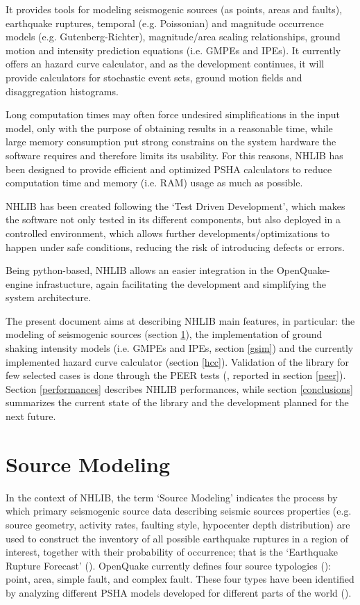 \documentclass[11pt,a4paper,headings=small,dvips]{scrartcl}
\begin{document}
It provides tools for modeling seismogenic sources (as points, areas and 
faults), earthquake ruptures, temporal (e.g. Poissonian) and magnitude 
occurrence models (e.g. Gutenberg-Richter), magnitude/area scaling 
relationships, ground motion and intensity prediction equations (i.e. 
GMPEs and IPEs). It currently offers an hazard curve calculator, and 
as the development continues, it will provide calculators for stochastic 
event sets, ground motion fields and disaggregation histograms.

Long computation times may often force undesired simplifications in the 
input model, only with the purpose of obtaining results in a reasonable 
time, while large memory consumption put strong constrains on the system 
hardware the software requires and therefore limits its usability.
For this reasons, NHLIB has been designed to provide efficient and 
optimized PSHA calculators to reduce computation time and memory (i.e. 
RAM) usage as much as possible. 

NHLIB has been created following the `Test Driven Development', which 
makes the software not only tested in its different components, but 
also deployed in a controlled environment, which allows further 
developments/optimizations to happen under safe conditions, reducing the risk 
of introducing defects or errors.

Being python-based, NHLIB allows an easier integration in the 
OpenQuake-engine infrastucture, again facilitating the development and 
simplifying the system architecture.

The present document aims at describing NHLIB main features, in particular: 
the modeling of seismogenic sources (section \ref{source_modeling}), the 
implementation of ground shaking intensity models (i.e. GMPEs and IPEs,
section \ref{gsim}) and the currently implemented hazard curve calculator 
(section \ref{hcc}). 
Validation of the library for few selected cases is done through the 
PEER tests (\cite{thomas2010}, reported in section \ref{peer}). Section 
\ref{performances} describes NHLIB performances, while section 
\ref{conclusions} summarizes the current state of the library and the 
development planned for the next future.

\section{Source Modeling}
\label{source_modeling}
\setcounter{figure}{0}
%
In the context of NHLIB, the term `Source Modeling' indicates the 
process by which primary seismogenic source data describing seismic 
sources properties (e.g. source geometry, activity rates, faulting 
style, hypocenter depth distribution) are used to construct the 
inventory of all possible earthquake ruptures in a region of interest, 
together with their probability of occurrence; that is the `Earthquake 
Rupture Forecast' (\cite{field2003}).
%
OpenQuake currently defines four source typologies (\cite{crowley2011}): 
point, area, simple fault, and complex fault. These four types have been 
identified by analyzing different PSHA models developed for different 
parts of the world (\cite{pagani2010}).
\end{document}
